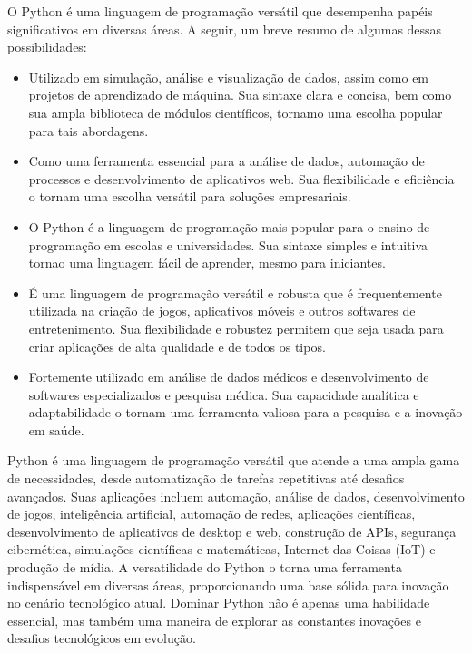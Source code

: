\documentclass[letterpaper,10pt,english]{jupyterBook}
\begin{document}
\sphinxAtStartPar
O Python é uma linguagem de programação versátil que desempenha papéis significativos em diversas áreas. A seguir, um breve resumo de algumas dessas possibilidades:
\begin{itemize}
\item {} 
\sphinxAtStartPar
{} Utilizado em simulação, análise e visualização de dados, assim como em projetos de aprendizado de máquina. Sua sintaxe clara e concisa, bem como sua ampla biblioteca de módulos científicos, tornam\sphinxhyphen{}o uma escolha popular para tais abordagens.

\item {} 
\sphinxAtStartPar
{} Como uma ferramenta essencial para a análise de dados, automação de processos e desenvolvimento de aplicativos web. Sua flexibilidade e eficiência o tornam uma escolha versátil para soluções empresariais.

\item {} 
\sphinxAtStartPar
{} O Python é a linguagem de programação mais popular para o ensino de programação em escolas e universidades. Sua sintaxe simples e intuitiva torna\sphinxhyphen{}o uma linguagem fácil de aprender, mesmo para iniciantes.

\item {} 
\sphinxAtStartPar
{} É uma linguagem de programação versátil e robusta que é frequentemente utilizada na criação de jogos, aplicativos móveis e outros softwares de entretenimento. Sua flexibilidade e robustez permitem que seja usada para criar aplicações de alta qualidade e de todos os tipos.

\item {} 
\sphinxAtStartPar
{} Fortemente utilizado em análise de dados médicos e desenvolvimento de softwares especializados e pesquisa médica. Sua capacidade analítica e adaptabilidade o tornam uma ferramenta valiosa para a pesquisa e a inovação em saúde.

\end{itemize}

\sphinxAtStartPar
Python é uma linguagem de programação versátil que atende a uma ampla gama de necessidades, desde automatização de tarefas repetitivas até desafios avançados. Suas aplicações incluem automação, análise de dados, desenvolvimento de jogos, inteligência artificial, automação de redes, aplicações científicas, desenvolvimento de aplicativos de desktop e web, construção de APIs, segurança cibernética, simulações científicas e matemáticas, Internet das Coisas (IoT) e produção de mídia. A versatilidade do Python o torna uma ferramenta indispensável em diversas áreas, proporcionando uma base sólida para inovação no cenário tecnológico atual. Dominar Python não é apenas uma habilidade essencial, mas também uma maneira de explorar as constantes inovações e desafios tecnológicos em evolução.
\end{document}
